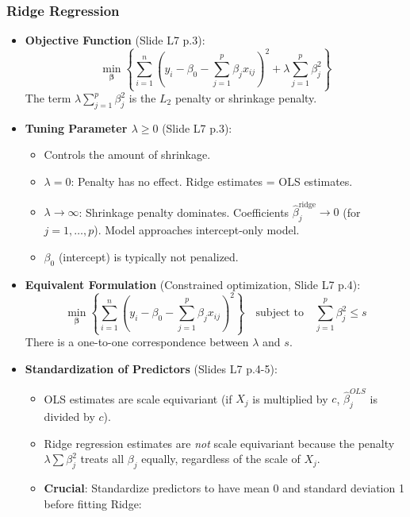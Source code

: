 \documentclass[12pt,a4paper]{article}
\begin{document}
\begin{itemize}
\begin{itemize}
    \subsubsection{Ridge Regression }
        \begin{itemize}
            \item \textbf{Objective Function} (Slide L7 p.3):
                $$ \min_{\boldsymbol{\beta}} \left\{ \sum_{i=1}^{n} \left(y_i - \beta_0 - \sum_{j=1}^{p} \beta_j x_{ij}\right)^2 + \lambda \sum_{j=1}^{p} \beta_j^2 \right\} $$
                The term $\lambda \sum_{j=1}^{p} \beta_j^2$ is the $L_2$ penalty or shrinkage penalty.
            \item \textbf{Tuning Parameter $\lambda \ge 0$} (Slide L7 p.3):
                \begin{itemize}
                    \item Controls the amount of shrinkage.
                    \item $\lambda = 0$: Penalty has no effect. Ridge estimates = OLS estimates.
                    \item $\lambda \to \infty$: Shrinkage penalty dominates. Coefficients $\hat{\beta}_j^{\text{ridge}} \to 0$ (for $j=1, \dots, p$). Model approaches intercept-only model.
                    \item $\beta_0$ (intercept) is typically not penalized.
                \end{itemize}
            \item \textbf{Equivalent Formulation} (Constrained optimization, Slide L7 p.4):
                $$ \min_{\boldsymbol{\beta}} \left\{ \sum_{i=1}^{n} \left(y_i - \beta_0 - \sum_{j=1}^{p} \beta_j x_{ij}\right)^2 \right\} \quad \text{subject to} \quad \sum_{j=1}^{p} \beta_j^2 \le s $$
                There is a one-to-one correspondence between $\lambda$ and $s$.
            \item \textbf{Standardization of Predictors} (Slides L7 p.4-5):
                \begin{itemize}
                    \item OLS estimates are scale equivariant (if $X_j$ is multiplied by $c$, $\hat{\beta}_j^{OLS}$ is divided by $c$).
                    \item Ridge regression estimates are \textit{not} scale equivariant because the penalty $\lambda \sum \beta_j^2$ treats all $\beta_j$ equally, regardless of the scale of $X_j$.
                    \item \textbf{Crucial}: Standardize predictors to have mean 0 and standard deviation 1 before fitting Ridge:

\end{itemize}
\end{itemize}
\end{itemize}
\end{itemize}
\end{document}
